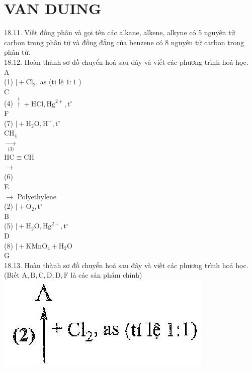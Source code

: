 \documentclass[10pt]{article}
\begin{document}
\section*{VAN DUING}
18.11. Viết đồng phân và gọi tên các alkane, alkene, alkyne có 5 nguyên tử carbon trong phân tữ và đồng đẳng của benzene có 8 nguyên tữ carbon trong phân tử.\\
18.12. Hoàn thành sơ đồ chuyển hoá sau đây và viết các phương trình hoá học.\\
A\\
(1) $\mid+\mathrm{Cl}_{2}$, as (ti lệ $1: 1$ )\\
C\\
(4) $\stackrel{t}{\dagger}+\mathrm{HCl}, \mathrm{Hg}^{2+}, \mathrm{t}^{\circ}$\\
F\\
(7) $\mid+\mathrm{H}_{2} \mathrm{O}, \mathrm{H}^{+}, \mathrm{t}^{\circ}$\\
$\mathrm{CH}_{4}$\\
$\xrightarrow[\text { (3) }]{ }$\\
$\mathrm{HC} \equiv \mathrm{CH}$\\
$\longrightarrow$\\
(6)\\
E\\
$\longrightarrow$ Polyethylene\\
(2) $\mid+\mathrm{O}_{2}, \mathrm{t}^{\circ}$\\
B\\
(5) $\mid+\mathrm{H}_{2} \mathrm{O}, \mathrm{Hg}^{2+}, \mathrm{t}^{\circ}$\\
D\\
(8) $\mid+\mathrm{KMnO}_{4}+\mathrm{H}_{2} \mathrm{O}$\\
G\\
18.13. Hoàn thành sơ đồ chuyển hoá sau đây và viết các phương trình hoá học. (Biết $\mathrm{A}, \mathrm{B}, \mathrm{C}, \mathrm{D}, \mathrm{D}, \mathrm{F}$ là các sản phẩm chính)\\
\includegraphics[max width=\textwidth, center]{2025_10_23_fa9073eecee116ad8cf2g-62(1)}
\end{document}
